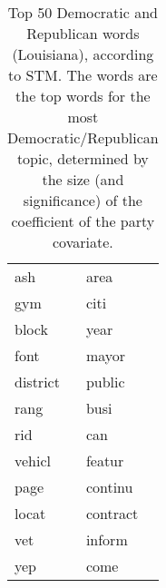 \begin{table}[ht]
\begin{tabular}{ll}
  ash & area \\ 
  gym & citi \\ 
  block & year \\ 
  font & mayor \\ 
  district & public \\ 
  rang & busi \\ 
  rid & can \\ 
  vehicl & featur \\ 
  page & continu \\ 
  locat & contract \\ 
  vet & inform \\ 
  yep & come \\ 
   \hline
\end{tabular}
\endgroup
\caption{Top 50 Democratic and Republican words (Louisiana), according to STM. 
             The words are the top words for the most Democratic/Republican topic, determined
             by the size (and significance) of the coefficient of the party covariate.} 
\label{tabSTMLA}
\end{table}

